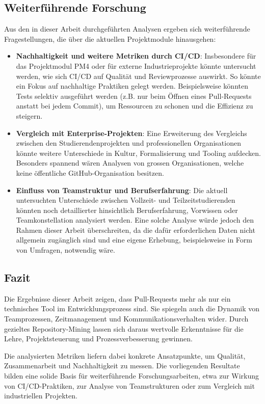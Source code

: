 \subsection{Weiterführende Forschung}
Aus den in dieser Arbeit durchgeführten Analysen ergeben sich weiterführende Fragestellungen, die über die aktuellen Projektmodule hinausgehen:
\begin{itemize}
\item \textbf{Nachhaltigkeit und weitere Metriken durch CI/CD}: Insbesondere für das Projektmodul PM4 oder für externe Industrieprojekte könnte untersucht werden, wie sich CI/CD auf Qualität und Reviewprozesse auswirkt. So könnte ein Fokus auf nachhaltige Praktiken gelegt werden. Beispielsweise könnten Tests selektiv ausgeführt werden (z.B. nur beim Öffnen eines Pull-Requests anstatt bei jedem Commit), um Ressourcen zu schonen und die Effizienz zu steigern.
\item \textbf{Vergleich mit Enterprise-Projekten}: Eine Erweiterung des Vergleichs zwischen den Studierendenprojekten und professionellen Organisationen könnte weitere Unterschiede in Kultur, Formalisierung und Tooling aufdecken. Besonders spannend wären Analysen von grossen Organisationen, welche keine öffentliche GitHub-Organisation besitzen.
\item \textbf{Einfluss von Teamstruktur und Berufserfahrung}: Die aktuell untersuchten Unterschiede zwischen Vollzeit- und Teilzeitstudierenden könnten noch detaillierter hinsichtlich Berufserfahrung, Vorwissen oder Teamkonstellation \linebreak analysiert werden. Eine solche Analyse würde jedoch den Rahmen dieser Arbeit überschreiten, da die dafür erforderlichen Daten nicht allgemein zugänglich sind und eine eigene Erhebung, beispielsweise in Form von Umfragen, notwendig wäre.
\end{itemize}


\subsection{Fazit}

Die Ergebnisse dieser Arbeit zeigen, dass Pull-Requests mehr als nur ein technisches Tool im Entwicklungsprozess sind. Sie spiegeln auch die Dynamik von Teamprozessen, Zeitmanagement und Kommunikationsverhalten wider. Durch gezieltes Repository-Mining lassen sich daraus wertvolle Erkenntnisse für die Lehre, Projektsteuerung und Prozessverbesserung gewinnen.

Die analysierten Metriken liefern dabei konkrete Ansatzpunkte, um Qualität, Zusammenarbeit und Nachhaltigkeit zu messen.
Die vorliegenden Resultate bilden eine solide Basis für weiterführende Forschungsarbeiten, etwa zur Wirkung von CI/CD-Praktiken, zur Analyse von Teamstrukturen oder zum Vergleich mit industriellen Projekten.
